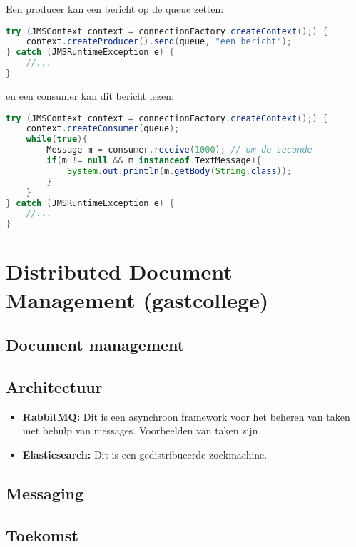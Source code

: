\documentclass{report}
\begin{document}
Een producer kan een bericht op de queue zetten:
\begin{lstlisting}[language=java]
try (JMSContext context = connectionFactory.createContext();) {
	context.createProducer().send(queue, "een bericht");
} catch (JMSRuntimeException e) {
	//...
}
\end{lstlisting}
en een consumer kan dit bericht lezen:
\begin{lstlisting}[language=java]
try (JMSContext context = connectionFactory.createContext();) {
	context.createConsumer(queue);
	while(true){
		Message m = consumer.receive(1000); // om de seconde
		if(m != null && m instanceof TextMessage){
			System.out.println(m.getBody(String.class));
		}
	}
} catch (JMSRuntimeException e) {
	//...
}
	\end{lstlisting}


\chapter{Distributed Document Management (gastcollege)}
\section{Document management}

\section{Architectuur}
\begin{itemize}
	\item[\info] \textbf{RabbitMQ:} Dit is een asynchroon framework voor het beheren van taken met behulp van messages. Voorbeelden van taken zijn
	\item[\info] \textbf{Elasticsearch:} Dit is een gedistribueerde zoekmachine. 
\end{itemize}
\section{Messaging}

\section{Toekomst}
\end{document}
